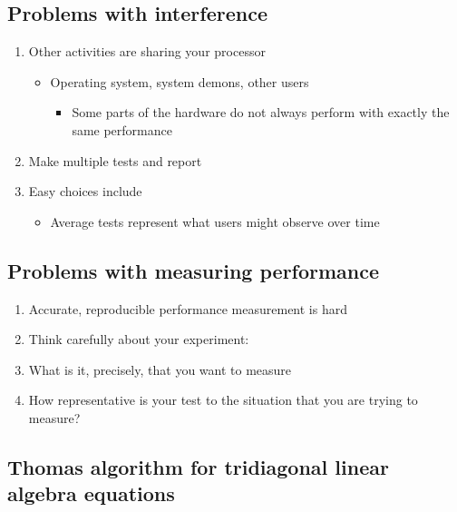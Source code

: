 \documentclass[%
oneside,                 %
final,                   %
10pt]{article}
\begin{document}
\subsection*{Problems with interference}
\begin{enumerate}
\item Other activities are sharing your processor
\begin{itemize}

  \item Operating system, system demons, other users
\begin{itemize}

   \item Some parts of the hardware do not always perform with exactly the same performance

\end{itemize}

\noindent
\end{itemize}

\noindent
\item Make multiple tests and report

\item Easy choices include
\begin{itemize}

  \item Average tests represent what users might observe over time
\end{itemize}

\noindent
\end{enumerate}

\noindent
\subsection*{Problems with measuring performance}
\begin{enumerate}
\item Accurate, reproducible performance measurement is hard

\item Think carefully about your experiment:

\item What is it, precisely, that you want to measure

\item How representative is your test to the situation that you are trying to measure?
\end{enumerate}

\noindent
\subsection*{Thomas algorithm for tridiagonal linear algebra equations}
\end{document}
